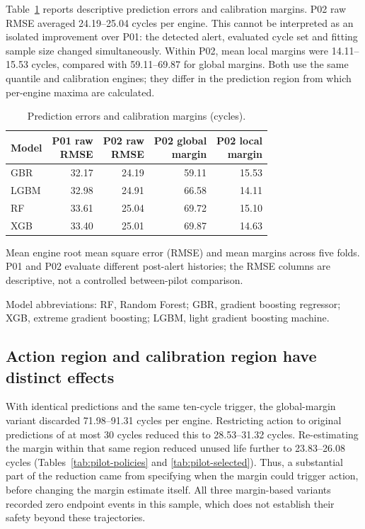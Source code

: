 \documentclass[12pt]{article}
\newcommand{\tablenotes}[1]{\par\smallskip\footnotesize #1}
\begin{document}
Table~\ref{tab:pilot-prediction} reports descriptive prediction errors and calibration margins. P02 raw RMSE averaged 24.19--25.04 cycles per engine. This cannot be interpreted as an isolated improvement over P01: the detected alert, evaluated cycle set and fitting sample size changed simultaneously. Within P02, mean local margins were 14.11--15.53 cycles, compared with 59.11--69.87 for global margins. Both use the same quantile and calibration engines; they differ in the prediction region from which per-engine maxima are calculated.

\begin{table}[htbp]
\centering
\caption{Prediction errors and calibration margins (cycles).}
\label{tab:pilot-prediction}
\footnotesize
\setlength{\tabcolsep}{3pt}
\begin{tabularx}{\linewidth}{@{}Xrrrr@{}}
\toprule
Model & \shortstack{P01 raw\\RMSE} & \shortstack{P02 raw\\RMSE} & \shortstack{P02 global\\margin} & \shortstack{P02 local\\margin} \\
\midrule
GBR & 32.17 & 24.19 & 59.11 & 15.53 \\
LGBM & 32.98 & 24.91 & 66.58 & 14.11 \\
RF & 33.61 & 25.04 & 69.72 & 15.10 \\
XGB & 33.40 & 25.01 & 69.87 & 14.63 \\
\bottomrule
\end{tabularx}
\tablenotes{Mean engine root mean square error (RMSE) and mean margins across five folds. P01 and P02 evaluate different post-alert histories; the RMSE columns are descriptive, not a controlled between-pilot comparison.

Model abbreviations: RF, Random Forest; GBR, gradient boosting regressor; XGB, extreme gradient boosting; LGBM, light gradient boosting machine.}
\end{table}

\subsection{Action region and calibration region have distinct effects}

With identical predictions and the same ten-cycle trigger, the global-margin variant discarded 71.98--91.31 cycles per engine. Restricting action to original predictions of at most 30 cycles reduced this to 28.53--31.32 cycles. Re-estimating the margin within that same region reduced unused life further to 23.83--26.08 cycles (Tables~\ref{tab:pilot-policies} and \ref{tab:pilot-selected}). Thus, a substantial part of the reduction came from specifying when the margin could trigger action, before changing the margin estimate itself. All three margin-based variants recorded zero endpoint events in this sample, which does not establish their safety beyond these trajectories.
\end{document}
